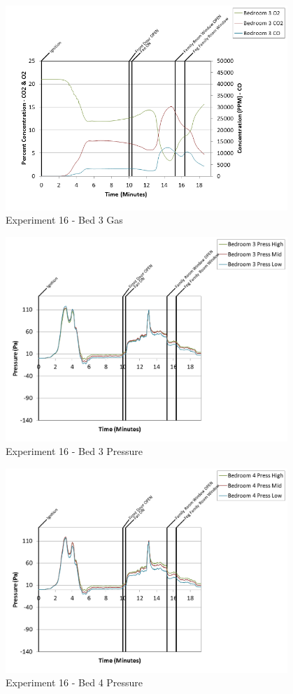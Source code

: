 \documentclass{article}
\begin{document}
\begin{appendices}
\clearpage

\begin{figure}[h!]
	\centering
	\includegraphics[height=3.05in]{0_Images/Results_Charts/Exp_16_Charts/Bed3Gas.png}
	\caption{Experiment 16 - Bed 3 Gas}
\end{figure}


\begin{figure}[h!]
	\centering
	\includegraphics[height=3.05in]{0_Images/Results_Charts/Exp_16_Charts/Bed3Pressure.png}
	\caption{Experiment 16 - Bed 3 Pressure}
\end{figure}

\clearpage

\begin{figure}[h!]
	\centering
	\includegraphics[height=3.05in]{0_Images/Results_Charts/Exp_16_Charts/Bed4Pressure.png}
	\caption{Experiment 16 - Bed 4 Pressure}
\end{figure}



\end{appendices}
\end{document}
